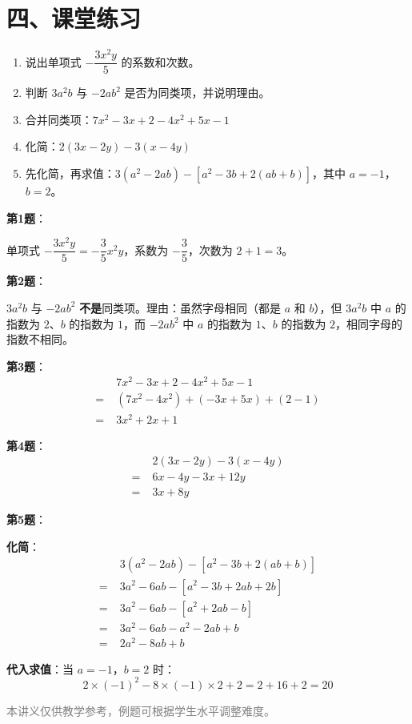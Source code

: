\documentclass[12pt, a4paper]{ctexart}
\begin{document}
\section*{\textcolor{tipgreen}{四、课堂练习}}

\begin{enumerate}[leftmargin=*]
  \item 说出单项式 $-\dfrac{3x^2y}{5}$ 的系数和次数。

  \item 判断 $3a^2b$ 与 $-2ab^2$ 是否为同类项，并说明理由。

  \item 合并同类项：$7x^2 - 3x + 2 - 4x^2 + 5x - 1$

  \item 化简：$2(3x - 2y) - 3(x - 4y)$

  \item 先化简，再求值：$3(a^2 - 2ab) - [a^2 - 3b + 2(ab + b)]$，其中 $a = -1$，$b = 2$。
\end{enumerate}

\vspace{10pt}

\begin{knowledgebox}[参考答案]
\textbf{第1题}：

单项式 $-\dfrac{3x^2y}{5} = -\dfrac{3}{5}x^2y$，系数为 $-\dfrac{3}{5}$，次数为 $2 + 1 = 3$。

\textbf{第2题}：

$3a^2b$ 与 $-2ab^2$ \textbf{不是}同类项。理由：虽然字母相同（都是 $a$ 和 $b$），但 $3a^2b$ 中 $a$ 的指数为 $2$、$b$ 的指数为 $1$，而 $-2ab^2$ 中 $a$ 的指数为 $1$、$b$ 的指数为 $2$，相同字母的指数不相同。

\textbf{第3题}：
\begin{align*}
&7x^2 - 3x + 2 - 4x^2 + 5x - 1 \\
=\;& (7x^2 - 4x^2) + (-3x + 5x) + (2 - 1) \\
=\;& 3x^2 + 2x + 1
\end{align*}

\textbf{第4题}：
\begin{align*}
&2(3x - 2y) - 3(x - 4y) \\
=\;& 6x - 4y - 3x + 12y \\
=\;& 3x + 8y
\end{align*}

\textbf{第5题}：

\textbf{化简}：
\begin{align*}
&3(a^2 - 2ab) - [a^2 - 3b + 2(ab + b)] \\
=\;& 3a^2 - 6ab - [a^2 - 3b + 2ab + 2b] \\
=\;& 3a^2 - 6ab - [a^2 + 2ab - b] \\
=\;& 3a^2 - 6ab - a^2 - 2ab + b \\
=\;& 2a^2 - 8ab + b
\end{align*}

\textbf{代入求值}：当 $a = -1$，$b = 2$ 时：
\[
2 \times (-1)^2 - 8 \times (-1) \times 2 + 2 = 2 + 16 + 2 = 20
\]
\end{knowledgebox}

\vfill
\begin{center}
\small\textcolor{gray}{本讲义仅供教学参考，例题可根据学生水平调整难度。}
\end{center}
\end{document}
